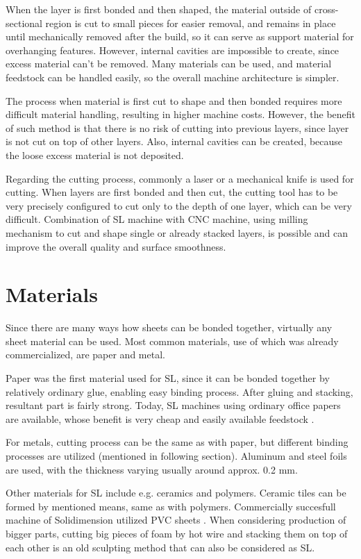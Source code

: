 \documentclass[a4paper, 11pt, reqno]{report}
\begin{document}
	When the layer is first bonded and then shaped, the material outside of cross-sectional region is cut to small pieces for easier removal, and remains in place until mechanically removed after the build, so it can serve as support material for overhanging features. However, internal cavities are impossible to create, since excess material can't be removed. Many materials can be used, and material feedstock can be handled easily, so the overall machine architecture is simpler.
	
	The process when material is first cut to shape and then bonded requires more difficult material handling, resulting in higher machine costs. However, the benefit of such method is that there is no risk of cutting into previous layers, since layer is not cut on top of other layers. Also, internal cavities can be created, because the loose excess material is not deposited.
	
	Regarding the cutting process, commonly a laser or a mechanical knife is used for cutting. When layers are first bonded and then cut, the cutting tool has to be very precisely configured to cut only to the depth of one layer, which can be very difficult. Combination of SL machine with CNC machine, using milling mechanism to cut and shape single or already stacked layers, is possible and can improve the overall quality and surface smoothness.

\section{Materials}
Since there are many ways how sheets can be bonded together, virtually any sheet material can be used. Most common materials, use of which was already commercialized, are paper and metal.

	Paper was the first material used for SL, since it can be bonded together by relatively ordinary glue, enabling easy binding process. After gluing and stacking, resultant part is fairly strong. Today, SL machines using ordinary office papers are available, whose benefit is very cheap and easily available feedstock \cite{mcor}.

	For metals, cutting process can be the same as with paper, but different binding processes are utilized (mentioned in following section). Aluminum and steel foils are used, with the thickness varying usually around approx. 0.2 mm.
	
	Other materials for SL include e.g. ceramics and polymers. Ceramic tiles can be formed by mentioned means, same as with polymers. Commercially succesfull machine of Solidimension utilized PVC sheets \cite{cubic}. When considering production of bigger parts, cutting big pieces of foam by hot wire and stacking them on top of each other is an old sculpting method that can also be considered as SL.
\end{document}
